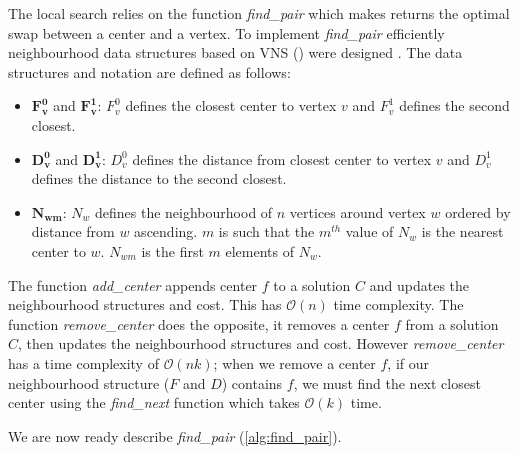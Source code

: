 The local search relies on the function \emph{find\_pair} which makes returns the optimal swap between a center and a vertex. To implement \emph{find\_pair} efficiently neighbourhood data structures based on VNS (\cite{mladenovic_solving_2003}) were designed . The data structures and notation are defined as follows:
\begin{itemize}
    \item $\mathbf{F^0_v}$ and $\mathbf{F^1_v}$: $F^0_v$ defines the closest center to vertex $v$ and $F^1_v$ defines the second closest.
    \item $\mathbf{D^0_v}$ and $\mathbf{D^1_v}$: $D^0_v$ defines the distance from closest center to vertex $v$ and $D^1_v$ defines the distance to the second closest.
    \item $\mathbf{N_{wm}}$: $N_w$ defines the neighbourhood of $n$ vertices around vertex $w$ ordered by distance from $w$ ascending. $m$ is such that the $m^{th}$ value of $N_w$ is the nearest center to $w$. $N_{wm}$ is the first $m$ elements of $N_w$.
\end{itemize}

The function \emph{add\_center} appends center $f$ to a solution $C$ and updates the neighbourhood structures and cost. This has $\mathcal{O}(n)$ time complexity. The function \emph{remove\_center} does the opposite, it removes a center $f$ from a solution $C$, then updates the neighbourhood structures and cost. However \emph{remove\_center} has a time complexity of $\mathcal{O}(nk)$; when we remove a center $f$, if our neighbourhood structure ($F$ and $D$) contains $f$, we must find the next closest center using the \emph{find\_next} function which takes $\mathcal{O}(k)$ time.

\begin{minipage}{0.48\textwidth}
    
\end{minipage}
\hspace{0.02\textwidth}
\begin{minipage}{0.48\textwidth}
    
\end{minipage}

We are now ready describe \emph{find\_pair} (\cref{alg:find_pair}). 



